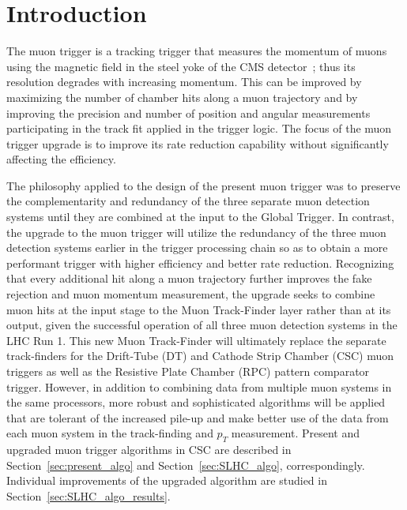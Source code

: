 \section{Introduction}

The muon trigger is a tracking trigger that measures the momentum of muons using the magnetic field in the steel yoke of the CMS detector~\cite{Chatrchyan:2008zzk}; thus its resolution degrades with increasing momentum. This can be improved by maximizing the number of chamber hits along a muon trajectory and by improving the precision and number of position and angular measurements participating in the track fit applied in the trigger logic. The focus of the muon trigger upgrade is to improve its rate reduction capability without significantly affecting the efficiency.

The philosophy applied to the design of the present muon trigger was to preserve the complementarity and redundancy of the three separate muon detection systems until they are combined at the input to the Global Trigger. In contrast, the upgrade to the muon trigger will utilize the redundancy of the three muon detection systems earlier in the trigger processing chain so as to obtain a more performant trigger with higher efficiency and better rate reduction. Recognizing that every additional hit along a muon trajectory further improves the fake rejection and muon momentum measurement, the upgrade seeks to combine muon hits at the input stage to the Muon Track-Finder layer rather than at its output, given the successful operation of all three muon detection systems in the LHC Run 1. This new Muon Track-Finder will ultimately replace the separate track-finders for the Drift-Tube (DT) and Cathode Strip Chamber (CSC) muon triggers as well as the Resistive Plate Chamber (RPC) pattern comparator trigger. However, in addition to combining data from multiple muon systems in the same processors, more robust and sophisticated algorithms will be applied that are tolerant of the increased pile-up and make better use of the data from each muon system in the track-finding and $p_T$ measurement. Present and upgraded muon trigger algorithms in CSC are described in Section~\ref{sec:present_algo} and Section~\ref{sec:SLHC_algo}, correspondingly. Individual improvements of the upgraded algorithm are studied in Section~\ref{sec:SLHC_algo_results}.

